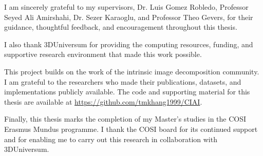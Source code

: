 I am sincerely grateful to my supervisors, Dr. Luis Gomez Robledo, Professor Seyed Ali
Amirshahi, Dr. Sezer Karaoglu, and Professor Theo Gevers, for their guidance, thoughtful
feedback, and encouragement throughout this thesis.

I also thank 3DUniversum for providing the computing resources, funding, and supportive
research environment that made this work possible.

This project builds on the work of the intrinsic image decomposition community. I am
grateful to the researchers who made their publications, datasets, and implementations
publicly available. The code and supporting material for this thesis are available at
\url{https://github.com/tmkhang1999/CIAI}.

Finally, this thesis marks the completion of my Master's studies in the COSI Erasmus Mundus
programme. I thank the COSI board for its continued support and for enabling me to carry out
this research in collaboration with 3DUniversum.
